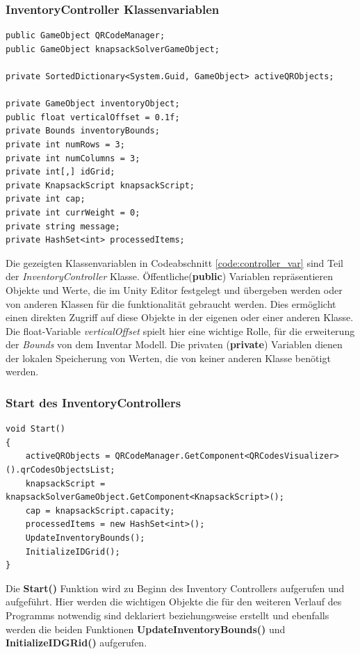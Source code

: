 \subsubsection{InventoryController Klassenvariablen}
\begin{lstlisting}[style=csharp, caption={Klassenvariablen der InventoryController Klasse}, label=code:controller_var]
public GameObject QRCodeManager;
public GameObject knapsackSolverGameObject;

private SortedDictionary<System.Guid, GameObject> activeQRObjects;

private GameObject inventoryObject;
public float verticalOffset = 0.1f;
private Bounds inventoryBounds;
private int numRows = 3;
private int numColumns = 3;
private int[,] idGrid;
private KnapsackScript knapsackScript;
private int cap;
private int currWeight = 0;
private string message;
private HashSet<int> processedItems;
\end{lstlisting}
Die gezeigten Klassenvariablen in Codeabschnitt \ref{code:controller_var} sind Teil der \textit{InventoryController} Klasse.
Öffentliche(\textbf{public}) Variablen repräsentieren Objekte und Werte, die im Unity Editor festgelegt und übergeben werden
oder von anderen Klassen für die funktionalität gebraucht werden. Dies ermöglicht einen direkten Zugriff auf diese Objekte in der
eigenen oder einer anderen Klasse. Die float-Variable \textit{verticalOffset} spielt hier eine
wichtige Rolle, für die erweiterung der \textit{Bounds} von dem Inventar Modell. Die privaten (\textbf{private}) Variablen dienen
der lokalen Speicherung von Werten, die von keiner anderen Klasse benötigt werden.\\

\subsubsection{Start des InventoryControllers}
\begin{lstlisting}[style=csharp, caption={Start Funktion des InventoryControllers}, label=code:controller_start]
void Start()
{
    activeQRObjects = QRCodeManager.GetComponent<QRCodesVisualizer>().qrCodesObjectsList;
    knapsackScript = knapsackSolverGameObject.GetComponent<KnapsackScript>();
    cap = knapsackScript.capacity;
    processedItems = new HashSet<int>();
    UpdateInventoryBounds();
    InitializeIDGrid();
}
\end{lstlisting}
Die \textbf{Start()} Funktion wird zu Beginn des Inventory Controllers aufgerufen und aufgeführt. Hier werden die
wichtigen Objekte die für den weiteren Verlauf des Programms notwendig sind deklariert beziehungsweise erstellt und
ebenfalls werden die beiden Funktionen \textbf{UpdateInventoryBounds()} und \textbf{InitializeIDGRid()} aufgerufen.\\


